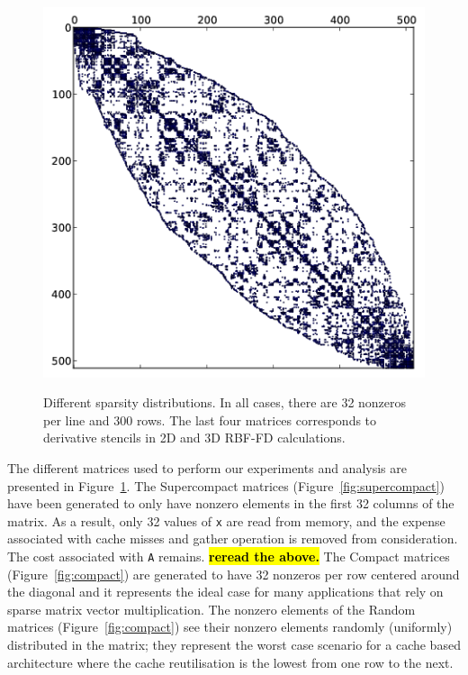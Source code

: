 \documentclass[10pt,conference,compsocconf]{IEEEtran}
\newcommand{\todo}[1]{{\color{red}\textbf{\hl{#1}}\xspace}}
\begin{document}
\begin{figure}[tbh]
\begin{center}
{      \label{fig:rbf3drcm}
      \includegraphics[width=\ww]{figures/kd-tree-3d-rcm-crop.png}}%
  \end{center}
  
  \caption{Different sparsity distributions. In all cases, there are
    32 nonzeros per line and 300 rows. The last four matrices
    corresponds to derivative stencils in 2D and 3D RBF-FD
    calculations.}
  \label{fig:spy_plots}
\end{figure}

The different matrices used to perform our experiments and analysis
are presented in Figure~\ref{fig:spy_plots}. The
Supercompact matrices (Figure~\ref{fig:supercompact}) have been
generated to only have nonzero elements in the first 32 columns of
the matrix. As a result, only 32 values of {\tt x} are read
from memory, and the expense associated with cache misses and gather
operation is removed from consideration. The cost associated with 
{\tt A} remains.   \todo{reread the above.}
The Compact matrices
(Figure~\ref{fig:compact}) are generated to have 32 nonzeros per row
centered around the diagonal and it represents the ideal case for many
applications that rely on sparse matrix vector multiplication. The nonzero
elements of the Random
matrices (Figure~\ref{fig:compact}) see their nonzero elements
randomly (uniformly) distributed in the matrix; they represent the
worst case scenario for a cache based architecture where the cache
reutilisation is the lowest from one row to the next.
\end{document}
